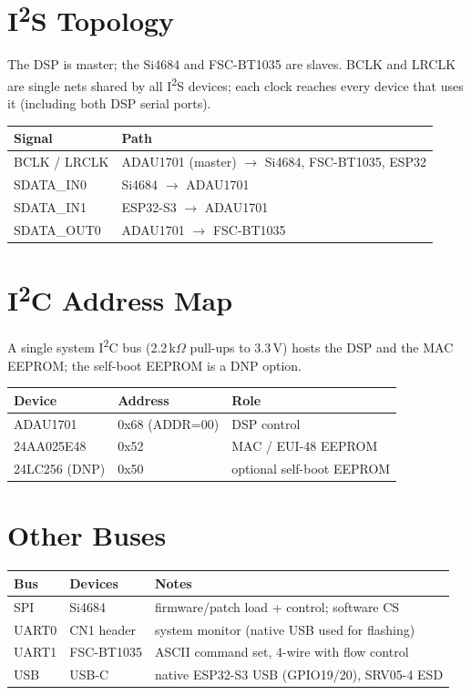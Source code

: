 \documentclass[11pt,a4paper]{report}
\begin{document}
\section{I\textsuperscript{2}S Topology}
The DSP is master; the Si4684 and FSC-BT1035 are slaves. BCLK and LRCLK are single
nets shared by all I\textsuperscript{2}S devices; each clock reaches every device that
uses it (including both DSP serial ports).
\begin{center}\begin{tabularx}{\textwidth}{@{}l X@{}}
\toprule \textbf{Signal} & \textbf{Path} \\ \midrule
BCLK / LRCLK & ADAU1701 (master) $\rightarrow$ Si4684, FSC-BT1035, ESP32 \\
SDATA\_IN0 & Si4684 $\rightarrow$ ADAU1701 \\
SDATA\_IN1 & ESP32-S3 $\rightarrow$ ADAU1701 \\
SDATA\_OUT0 & ADAU1701 $\rightarrow$ FSC-BT1035 \\
\bottomrule \end{tabularx}\end{center}

\section{I\textsuperscript{2}C Address Map}
A single system I\textsuperscript{2}C bus (2.2\,k$\Omega$ pull-ups to 3.3\,V) hosts the
DSP and the MAC EEPROM; the self-boot EEPROM is a DNP option.
\begin{center}\begin{tabularx}{\textwidth}{@{}l l X@{}}
\toprule \textbf{Device} & \textbf{Address} & \textbf{Role} \\ \midrule
ADAU1701 & 0x68 (ADDR=00) & DSP control \\
24AA025E48 & 0x52 & MAC / EUI-48 EEPROM \\
24LC256 (DNP) & 0x50 & optional self-boot EEPROM \\
\bottomrule \end{tabularx}\end{center}

\section{Other Buses}
\begin{center}\begin{tabularx}{\textwidth}{@{}l l X@{}}
\toprule \textbf{Bus} & \textbf{Devices} & \textbf{Notes} \\ \midrule
SPI & Si4684 & firmware/patch load + control; software CS \\
UART0 & CN1 header & system monitor (native USB used for flashing) \\
UART1 & FSC-BT1035 & ASCII command set, 4-wire with flow control \\
USB & USB-C & native ESP32-S3 USB (GPIO19/20), SRV05-4 ESD \\
\bottomrule \end{tabularx}\end{center}
\end{document}
